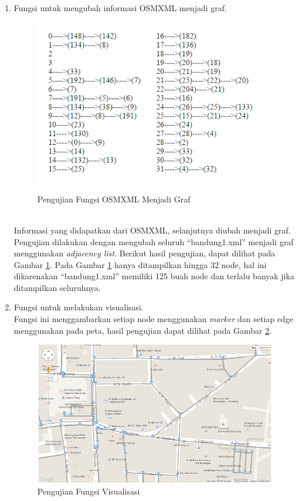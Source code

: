 \begin{enumerate}
\item Fungsi untuk mengubah informasi OSMXML menjadi graf.
\begin{figure}[h]
\centering
\includegraphics[scale=1]{Gambar/pu_graf}
\caption[Pengujian Fungsi OSMXML Menjadi Graf]{Pengujian Fungsi OSMXML Menjadi Graf}
\label{fig:pu_graf}
\end{figure}\\
  Informasi yang didapatkan dari OSMXML, selanjutnya diubah menjadi graf.
  Pengujian dilakukan dengan mengubah seluruh ``bandung1.xml'' menjadi graf
  menggunakan \textit{adjacency list}. Berikut hasil pengujian, dapat dilihat
  pada Gambar \ref{fig:pu_graf}. Pada Gambar \ref{fig:pu_graf} hanya ditampilkan
  hingga 32 node, hal ini dikarenakan ``bandung1.xml'' memiliki 125 buah node
  dan terlalu banyak jika ditampilkan seluruhnya.
  
  \item Fungsi untuk melakukan visualisasi.\\
  Fungsi ini menggambarkan setiap node menggunakan \textit{marker} dan
  setiap edge menggunakan  pada peta, hasil pengujian dapat
  dilihat pada Gambar \ref{fig:pu_visual}.
\begin{figure}[h]
\centering
\includegraphics[scale=0.48]{Gambar/pu_visual}
\caption[Pengujian Fungsi Visualisasi]{Pengujian Fungsi Visualisasi}
\label{fig:pu_visual}
\end{figure}


\end{enumerate}
